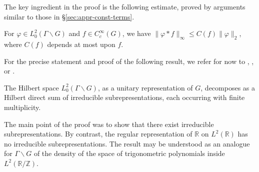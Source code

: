 \documentclass[reqno]{amsart} 
\begin{document}
The key ingredient in the proof is the following estimate, proved by arguments similar to those in \S\ref{sec:appr-const-terms}.
\begin{theorem}
  For $\varphi \in L^2_0(\Gamma \backslash G)$ and $f \in C _c ^\infty (G)$, we have $\|\varphi \ast f\| _\infty \leq C (f) \|\varphi \| _2 $, where $C(f)$ depends at most upon $f$.
\end{theorem}

For the precise statement and proof of the following result, we refer for now to \cite[Thm 16.2]{MR1482800}, \cite[\S9]{MR2331343}, or \cite[\S1.6]{MR3468638}.

\begin{theorem}
  The Hilbert space $L^2_0(\Gamma \backslash G)$, as a unitary representation of $G$, decomposes as a Hilbert direct sum of irreducible subrepresentations, each occurring with finite multiplicity.
\end{theorem}
The main point of the proof was to show that there exist irreducible subrepresentations.  By contrast, the regular representation of $\mathbb{R}$ on $L^2(\mathbb{R})$ has no irreducible subrepresentations.  The result may be understood as an analogue for $\Gamma \backslash G$ of the density of the space of trigonometric polynomials inside $L^2(\mathbb{R}/\mathbb{Z})$.

{} 
\end{document}
